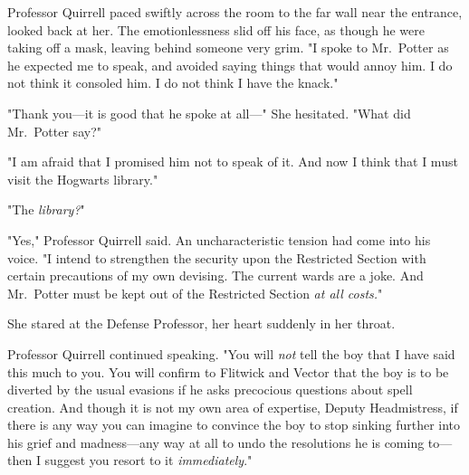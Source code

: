 Professor Quirrell paced swiftly across the room to the far wall near the
entrance, looked back at her. The emotionlessness slid off his face, as though
he were taking off a mask, leaving behind someone very grim. "I spoke to
Mr.~Potter as he expected me to speak, and avoided saying things that would
annoy him. I do not think it consoled him. I do not think I have the knack."

"Thank you---it is good that he spoke at all\mbox{---}" She hesitated. "What did
Mr.~Potter say?"

"I am afraid that I promised him not to speak of it. And now{\el} I think
that I must visit the Hogwarts library."

"The \emph{library?}"

"Yes," Professor Quirrell said. An uncharacteristic tension had come into his
voice. "I intend to strengthen the security upon the Restricted Section with
certain precautions of my own devising. The current wards are a joke. And
Mr.~Potter must be kept out of the Restricted Section \emph{at all costs.}"

She stared at the Defense Professor, her heart suddenly in her throat.

Professor Quirrell continued speaking. "You will \emph{not} tell the boy that I
have said this much to you. You will confirm to Flitwick and Vector that the
boy is to be diverted by the usual evasions if he asks precocious questions
about spell creation. And though it is not my own area of expertise, Deputy
Headmistress, if there is any way you can imagine to convince the boy to stop
sinking further into his grief and madness---any way at all to undo the
resolutions he is coming to---then I suggest you resort to it
\emph{immediately}."

